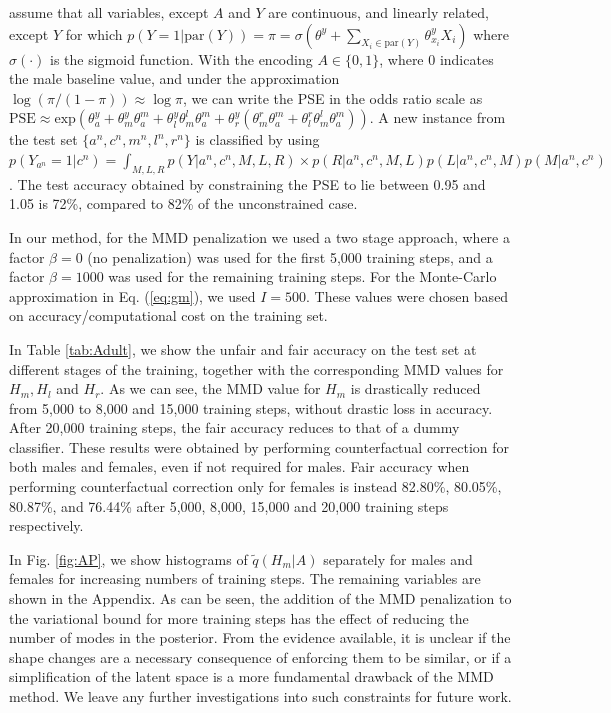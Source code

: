 \documentclass{article}
\newcommand{\figref}[1]{Fig. \ref{#1}}
\renewcommand{\eqref}[1]{Eq. (\ref{#1})}
\begin{document}
\citet{nabi18fair} assume that all variables, except $A$ and $Y$ are continuous, and linearly related, except $Y$ for which $p(Y=1|\textrm{par}(Y))=\pi=\sigma(\theta^y+\sum_{X_i\in\textrm{par}(Y)}\theta^y_{x_i}X_i)$
where $\sigma(\cdot)$ is the sigmoid function. With the encoding $A\in\{0,1\}$, where 0 indicates the male baseline value, and under the approximation $\log (\pi/(1-\pi))\approx \log \pi$, 
we can write the PSE in the odds ratio scale as $\textrm{PSE}\approx\textrm{exp}(\theta^y_{a}+\theta^y_{m}\theta^m_{a}+\theta^y_{l}\theta^l_{m}\theta^m_{a}+\theta^y_{r}(\theta^r_{m}\theta^m_{a}+\theta^r_{l}\theta^l_{m}\theta^m_{a}))$.
A new instance from the test set $\{a^n,c^n,m^n,l^n,r^n\}$ is classified by using $ p(Y_{a^n}=1|c^n)=\int_{M,L,R}p(Y|a^n,c^n,M,L,R) \times p(R|a^n,c^n,M,L)p(L|a^n,c^n,M)p(M|a^n,c^n)$. The 
test accuracy obtained by constraining the PSE to lie between 0.95 and 1.05 is 72\%, compared to 82\% of the unconstrained case.

In our method, for the MMD penalization we used a two stage approach, where a factor $\beta=0$ (no penalization) was used for the first 5,000 training steps, and a factor $\beta=1000$ was used for the remaining training steps. 
For the Monte-Carlo approximation in \eqref{eq:gm}, we used $I=500$. These values were chosen based on accuracy/computational cost on the training set.

In Table \ref{tab:Adult}, we show the unfair and fair accuracy on the test set at different stages of the training, together with the corresponding MMD values for $H_m, H_l$ and $H_r$. As we can see, 
the MMD value for $H_m$ is drastically reduced from 5,000 to 8,000 and 15,000 training steps, without drastic loss in accuracy. After 20,000 training steps, the fair accuracy reduces to 
that of a dummy classifier. 
These results were obtained by performing counterfactual correction for both males and females, even if not required for males.
Fair accuracy when performing counterfactual correction only for females is instead 82.80\%, 80.05\%, 80.87\%, and 76.44\% after 5,000, 8,000, 15,000 and 20,000 training steps respectively.

In \figref{fig:AP},
we show histograms of $\tilde q(H_m|A)$ separately for males and females for increasing numbers of training steps. The remaining variables are shown in the Appendix.
As can be seen, the addition of the MMD penalization to the variational bound for more training steps has the effect of reducing the number of modes in the posterior. 
From the evidence available, it is unclear if the shape changes are a necessary consequence of enforcing 
them to be similar, or if a simplification of the latent space is a more fundamental drawback of the MMD method. 
We leave any further investigations into such constraints for future work.
\end{document}
